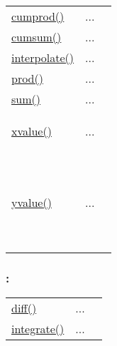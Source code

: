 \textcolor{blue}{}\begin{tabular}{>{\raggedleft}b{3cm}>{\centering}b{0.5cm}>{\raggedright}b{12cm}}
\textcolor{blue}{\hyperlink{cumprod}{cumprod()}}&
...&
 \begin{NoHyper} \nameref{par:Cumulative-product} \end{NoHyper}\tabularnewline
\textcolor{blue}{\hyperlink{cumsum}{cumsum()}}&
...&
 \begin{NoHyper} \nameref{par:Cumulative-sum} \end{NoHyper}\tabularnewline
\textcolor{blue}{\hyperlink{interpolate}{interpolate()}}&
...&
 \begin{NoHyper} \nameref{par:spline-interpolation} \end{NoHyper}\tabularnewline
\textcolor{blue}{\hyperlink{prod}{prod()}}&
...&
 \begin{NoHyper} \nameref{par:Prod} \end{NoHyper}\tabularnewline
\textcolor{blue}{\hyperlink{sum}{sum()}}&
...&
 \begin{NoHyper} \nameref{par:Sum} \end{NoHyper}\tabularnewline
\textcolor{blue}{\hyperlink{xvalue}{xvalue()}}

\textcolor{blue}{~}&
...

\textcolor{blue}{~}&
 \begin{NoHyper} \nameref{par:xvalue} \end{NoHyper}\tabularnewline
\textcolor{blue}{\hyperlink{yvalue}{yvalue()}}

\textcolor{blue}{~}&
...

\textcolor{blue}{~}&
 \begin{NoHyper} \nameref{par:yvalue} \end{NoHyper}\tabularnewline
\end{tabular}


\subsubsection*{: }

\textcolor{blue}{}\begin{tabular}{>{\raggedleft}p{3cm}>{\centering}p{0.5cm}l}
\textcolor{blue}{\hyperlink{diff}{diff()}}&
...&
 \begin{NoHyper} \nameref{par:Differentiate} \end{NoHyper}\tabularnewline
\textcolor{blue}{\hyperlink{integrate}{integrate()}}&
...&
 \begin{NoHyper} \nameref{par:Integrate} \end{NoHyper}\tabularnewline
\end{tabular}


